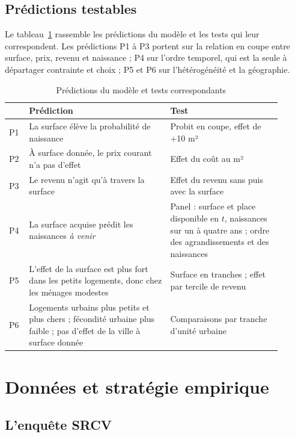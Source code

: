 \documentclass[11pt,a4paper]{article}
\theoremstyle{plain}
\theoremstyle{definition}
\theoremstyle{remark}
\begin{document}
\subsection{Prédictions testables}

Le tableau~\ref{tab:predictions} rassemble les prédictions du modèle et les tests qui leur correspondent. Les prédictions P1 à P3 portent sur la relation en coupe entre surface, prix, revenu et naissance ; P4 sur l'ordre temporel, qui est la seule à départager contrainte et choix ; P5 et P6 sur l'hétérogénéité et la géographie.

\begin{table}[htbp]
\centering\small
\begin{threeparttable}
\caption{Prédictions du modèle et tests correspondants}\label{tab:predictions}
\begin{tabular}{@{}p{0.06\linewidth}p{0.47\linewidth}p{0.37\linewidth}@{}}
\toprule
& Prédiction & Test \\
\midrule
P1 & La surface élève la probabilité de naissance & Probit en coupe, effet de +10 m² \\
P2 & À surface donnée, le prix courant n'a pas d'effet & Effet du coût au m² \\
P3 & Le revenu n'agit qu'à travers la surface & Effet du revenu sans puis avec la surface \\
P4 & La surface acquise prédit les naissances \emph{à venir} & Panel : surface et place disponible en $t$, naissances sur un à quatre ans ; ordre des agrandissements et des naissances \\
P5 & L'effet de la surface est plus fort dans les petits logements, donc chez les ménages modestes & Surface en tranches ; effet par tercile de revenu \\
P6 & Logements urbains plus petits et plus chers ; fécondité urbaine plus faible ; pas d'effet de la ville à surface donnée & Comparaisons par tranche d'unité urbaine \\
\bottomrule
\end{tabular}
\end{threeparttable}
\end{table}

\section{Données et stratégie empirique}\label{sec:donnees}

\subsection{L'enquête SRCV}
\end{document}
